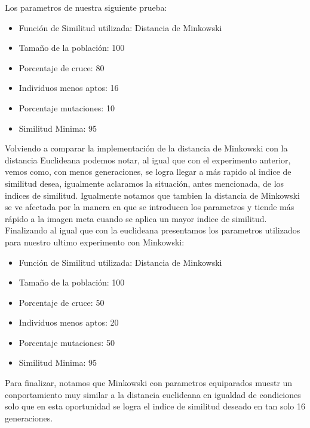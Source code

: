 \documentclass[conference]{C:/Program Files (x86)/MiKTeX 2.9/tex/latex/ltxmisc/IEEEtran}
\begin{document}
Los parametros de nuestra siguiente prueba:
\begin{itemize}
	\item Función de Similitud utilizada: Distancia de Minkowski
	\item Tamaño de la población: 100
	\item Porcentaje de cruce: 80
	\item Individuos menos aptos: 16
	\item Porcentaje mutaciones: 10
	\item Similitud Minima: 95
\end{itemize}
Volviendo a comparar la implementación de la distancia de Minkowski con la distancia Euclideana podemos notar, al igual que con el experimento anterior, vemos como, con menos generaciones, se logra llegar a  más rapido al indice de similitud desea, igualmente aclaramos la situación, antes mencionada, de los indices de similitud. Igualmente notamos que tambien la distancia de Minkowski se ve afectada por la manera en que se introducen los parametros y tiende más rápido a la imagen meta cuando se aplica un mayor indice de similitud.
Finalizando al igual que con la euclideana presentamos los parametros utilizados para nuestro ultimo experimento con Minkowski:
\begin{itemize}
	\item Función de Similitud utilizada: Distancia de Minkowski
	\item Tamaño de la población: 100
	\item Porcentaje de cruce: 50
	\item Individuos menos aptos: 20
	\item Porcentaje mutaciones: 50
	\item Similitud Minima: 95
\end{itemize}
Para finalizar, notamos que Minkowski con parametros equiparados muestr un conportamiento muy similar a la distancia euclideana en igualdad de condiciones solo que en esta oportunidad se logra el indice de similitud deseado en tan solo 16 generaciones.
\end{document}
